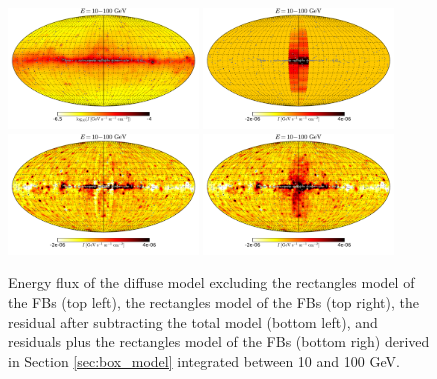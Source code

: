 \begin{figure}[h]
\centering
 \includegraphics[width=0.45\textwidth]{plots/Mollweide_Boxes_model_03-10GeV_flux_source_range_1_log.pdf}
\includegraphics[width=0.45\textwidth]{plots/Mollweide_Boxes_03-10GeV_flux_source_range_1.pdf}\\
\includegraphics[width=0.45\textwidth]{plots/Mollweide_Boxes_residual_03-10GeV_flux_source_range_1.pdf}
 \includegraphics[width=0.45\textwidth]{plots/Mollweide_Boxes_residual+boxes_03-10GeV_flux_source_range_1.pdf}
 \caption{Energy flux of the diffuse model excluding the rectangles model of the FBs (top left),
 the rectangles model of the FBs (top right), 
the residual after subtracting the total model (bottom left),
and residuals plus the rectangles model of the FBs (bottom righ)
 derived in Section \ref{sec:box_model}
 integrated between 10 and 100 GeV.}
 \label{fig:Maps_Rectangles}
\end{figure}

